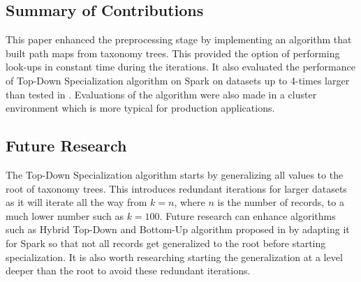 \documentclass[11pt]{article}       %
\begin{document}
\subsection{Summary of Contributions}

This paper enhanced the preprocessing stage by implementing an algorithm that built path maps from taxonomy trees. This provided the option of performing look-ups in constant time during the iterations. It also evaluated the performance of Top-Down Specialization algorithm on Spark on datasets up to 4-times larger than tested in \cite{Sopaoglu:2017}. Evaluations of the algorithm were also made in a cluster environment which is more typical for production applications.

\subsection{Future Research}

The Top-Down Specialization algorithm starts by generalizing all values to the root of taxonomy trees. This introduces redundant iterations for larger datasets as it will iterate all the way from \(k=n\), where $n$ is the number of records, to a much lower number such as \(k=100\). Future research can enhance algorithms such as Hybrid Top-Down and Bottom-Up algorithm proposed in \cite{Zhang:2013} by adapting it for Spark so that not all records get generalized to the root before starting specialization. It is also worth researching starting the generalization at a level deeper than the root to avoid these redundant iterations.



\end{document}
